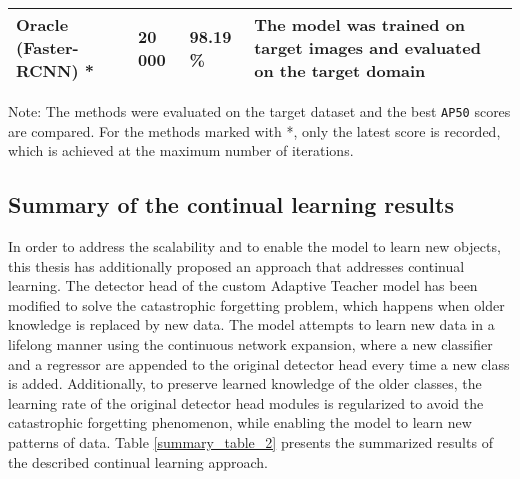 \begin{table}
\begin{tabularx}{0.95\textwidth}{|X|X|X|X|}
        \hline
        Oracle (Faster-RCNN) \cite{ima} * & 20 000 & 98.19 \% & \multicolumn{1}{m{3cm}|}{The model was trained on target images and evaluated on the target domain} \\
        \hline
\end{tabularx}
\begin{tablenotes}
      \small
      \item Note: The methods were evaluated on the target dataset and the best \texttt{AP50} scores are compared. For the methods marked with *, only the latest score is recorded, which is achieved at the maximum number of  iterations. 
    \end{tablenotes}
\end{table}
\FloatBarrier 

\subsection{Summary of the continual learning results}

In order to address the scalability and to enable the model to learn new objects, this thesis has additionally proposed an approach that addresses continual learning. The detector head of the custom Adaptive Teacher model has been modified to solve the catastrophic forgetting problem, which happens when older knowledge is replaced by new data. The model attempts to learn new data in a lifelong manner using the continuous network expansion, where a new classifier and a regressor are appended to the original detector head every time a new class is added. Additionally, to preserve learned knowledge of the older classes, the learning rate of the original detector head modules is regularized to avoid the catastrophic forgetting phenomenon, while enabling the model to learn new patterns of data. Table \ref{summary_table_2} presents the summarized results of the described continual learning approach.  


